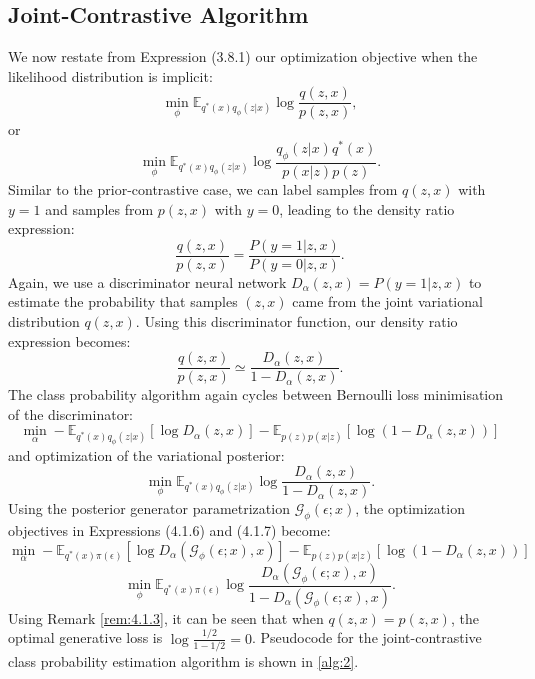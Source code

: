 \documentclass[honours,12pt]{unswthesis}
\numberwithin{equation}{section}
\theoremstyle{definition}
\begin{document}
\subsection{Joint-Contrastive Algorithm}\label{sec:4.1.3}
We now restate from Expression (3.8.1) our optimization objective when the likelihood distribution is implicit:
\[\min_\phi \mathbb{E}_{q^*(x)q_\phi(z|x)}\log \frac{q(z,x)}{p(z,x)},\]
or
\[\min_\phi \mathbb{E}_{q^*(x)q_\phi(z|x)}\log \frac{q_\phi(z|x)q^*(x)}{p(x|z)p(z)}.\]
Similar to the prior-contrastive case, we can label samples from $q(z,x)$ with $y=1$ and samples from $p(z,x)$ with $y=0$, leading to the density ratio expression:
\[\frac{q(z,x)}{p(z,x)}=\frac{P(y=1|z,x)}{P(y=0|z,x)}.\]
Again, we use a discriminator neural network $D_\alpha(z,x)=P(y=1|z,x)$ to estimate the probability that samples $(z,x)$ came from the joint variational distribution $q(z,x)$. Using this discriminator function, our density ratio expression becomes:
\[\frac{q(z,x)}{p(z,x)}\simeq\frac{D_\alpha(z,x)}{1-D_\alpha(z,x)}.\]
The class probability algorithm again cycles between Bernoulli loss minimisation of the discriminator:
\begin{equation}
\min_\alpha -\mathbb{E}_{q^*(x)q_\phi(z|x)}[\log D_\alpha(z,x)]-\mathbb{E}_{p(z)p(x|z)}[\log (1-D_\alpha(z,x))]
\end{equation}
and optimization of the variational posterior:
\begin{equation}
\min_\phi \mathbb{E}_{q^*(x)q_\phi(z|x)}\log\frac{D_\alpha(z,x)}{1-D_\alpha(z,x)}.
\end{equation}
Using the posterior generator parametrization $\mathcal{G}_\phi (\epsilon;x)$, the optimization objectives in Expressions (4.1.6) and (4.1.7) become:
\[\min_\alpha -\mathbb{E}_{q^*(x)\pi(\epsilon)}[\log D_\alpha(\mathcal{G}_\phi(\epsilon;x), x)]-\mathbb{E}_{p(z)p(x|z)}[\log (1-D_\alpha(z,x))]\]
\[\min_\phi \mathbb{E}_{q^*(x)\pi(\epsilon)}\log\frac{D_\alpha(\mathcal{G}_\phi(\epsilon;x),x)}{1-D_\alpha(\mathcal{G}_\phi(\epsilon;x),x)}.\]
Using Remark \ref{rem:4.1.3}, it can be seen that when $q(z,x)=p(z,x)$, the optimal generative loss is $\log \frac{1/2}{1-1/2}=0$. Pseudocode for the joint-contrastive class probability estimation algorithm is shown in \autoref{alg:2}.
\newpage
\end{document}

